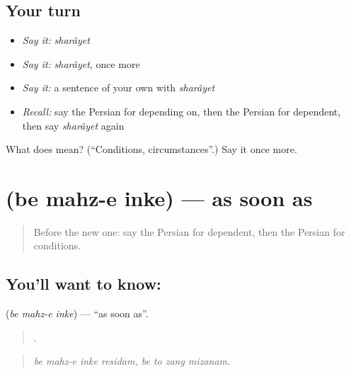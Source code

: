 \subsection*{Your turn}
\begin{itemize}
\raggedright
  \item \emph{Say it:} \emph{sharâyet}
  \item \emph{Say it:} \emph{sharâyet}, once more
  \item \emph{Say it:} a sentence of your own with \emph{sharâyet}
  \item \emph{Recall:} say the Persian for depending on, then the Persian for dependent, then say \emph{sharâyet} again
\end{itemize}

\begin{tcolorbox}[breakable,colback=teal!4,colframe=teal!35!black,title={Before you move on}]
What does  mean? (\textquotedblleft{}Conditions, circumstances\textquotedblright{}.) Say it once more.
\end{tcolorbox}
\section[\texorpdfstring{\fa{به} \fa{محض} \fa{اینکه} (be mahz-e inke)}{به محض اینکه (be mahz-e inke)}]{   (be mahz-e inke) — as soon as}

\label{lesson:FA-C395-be-mahz-e-inke}



\begin{quote}
Before the new one: say the Persian for dependent, then the Persian for conditions.
\end{quote}

\subsection*{You'll want to know:   }
\textbf{  } (\emph{be mahz-e inke}) — \textquotedblleft{}as soon as\textquotedblright{}.

\begin{quote}
       .
\end{quote}

\begin{quote}
\emph{be mahz-e inke residam, be to zang mizanam.}
\end{quote}

